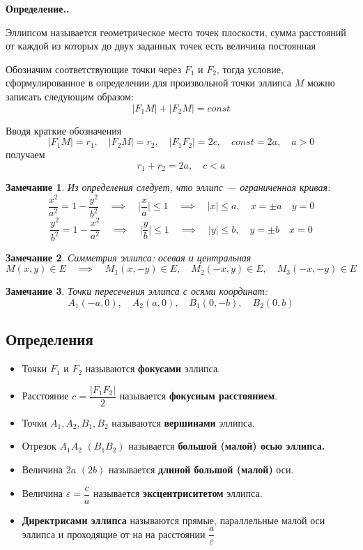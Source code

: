 \documentclass[a4paper,12pt,oneside]{extbook}
\newcommand{\newpar}{$ $\par\nobreak\ignorespaces}
\newenvironment{definition}[1][]{\noindent\textbf{Определение.\if\relax\detokenize{#1}\relax\else\;#1.\fi}\newpar}{\bigskip}
\theoremstyle{numbered}
\theoremstyle{unnumbered}
\theoremstyle{named}
\theoremstyle{unnumbered}
\theoremstyle{named}
\theoremstyle{named}
\theoremstyle{named}
\newtheorem*{note}{Замечание}
\begin{document}
\begin{definition}
    Эллипсом называется геометрическое место точек плоскости, сумма расстояний от каждой из которых до двух заданных точек есть величина постоянная

    Обозначим соответствующие точки через \(F_1\) и \(F_2\), тогда условие, сформулированное в определении для произвольной точки эллипса \(M\) можно записать следующим образом:
    \[
        |F_1 M| + |F_2 M| = const
    \]

    Вводя краткие обозначения
    \[
        |F_1 M| = r_1, \quad |F_2 M| = r_2, \quad |F_1 F_2| = 2c, \quad const = 2a, \quad a > 0
    \]
    получаем
    \[
        r_1 + r_2 = 2a, \quad c < a
    \]
    \begin{note}
        Из определения следует, что эллипс — ограниченная кривая:
        \[
            \frac{x^2}{a^2} = 1 - \frac{y^2}{b^2} \quad \implies \quad \Big| \frac{x}{a} \Big| \leq 1 \quad \implies \quad |x| \leq a, \quad x = \pm a \quad y = 0
        \]
        \[
            \frac{y^2}{b^2} = 1 - \frac{x^2}{a^2} \quad \implies \quad \Big| \frac{y}{b} \Big| \leq 1 \quad \implies \quad |y| \leq b, \quad y = \pm b \quad x = 0
        \]
    \end{note}

    \begin{note}
        Симметрия эллипса: осевая и центральная
        \[
            M(x, y) \in E \quad \implies \quad M_1 (x, -y) \in E, \quad M_2 (-x, y) \in E, \quad M_3 (-x, -y) \in E
        \]
    \end{note}

    \begin{note}
        Точки пересечения эллипса с осями координат:
        \[
            A_1 (-a, 0), \quad A_2 (a, 0), \quad B_1 (0, -b), \quad B_2 (0, b)
        \]
    \end{note}
\end{definition}

\subsection{Определения}%
\label{sub:Определения}
\begin{itemize}
    \item {Точки \(F_1\) и \(F_2\) называются \textbf{фокусами} эллипса.}
    \item {Расстояние \(c = \dfrac{|F_1 F_2|}{2}\) называется \textbf{фокусным расстоянием}.}
    \item {Точки \(A_1, A_2, B_1, B_2\) называются \textbf{вершинами} эллипса.}
    \item {Отрезок \(A_1 A_2\) \((B_1 B_2)\) называется \textbf{большой (малой) осью эллипса.}}
    \item {Величина \(2a\) \((2b)\) называется \textbf{длиной большой (малой)} оси.}
    \item {Величина \(\varepsilon = \dfrac{c}{a}\) называется \textbf{эксцентриситетом} эллипса.}
    \item {\textbf{Директрисами эллипса} называются прямые, параллельные малой оси эллипса и проходящие от на на расстоянии \(\dfrac{a}{\varepsilon}\)}
\end{itemize}
\end{document}
